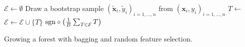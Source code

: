   \begin{algorithm}
    \begin{algorithmic}[1]
        \State $\mathcal{E} \gets \emptyset$  
          \State Draw a bootstrap sample $(\tilde{\mathbf{x}}_i, \tilde{y}_i)_{i = 1, \ldots, n}$ from 
            $(\mathbf{x}_i, y_i)_{i = 1, \ldots, n}$
          \State $T \gets$ 
          \State $\mathcal{E} \gets \mathcal{E} \cup \{T\}$
        \EndFor
        \State \Return $\mathrm{sgn} \circ \left( \frac{1}{B} \sum_{T \in \mathcal{E}} T \right)$
      \EndFunction
    \end{algorithmic}
    \caption{Growing a forest with bagging and random feature selection.} \label{alg:forest}
  \end{algorithm}